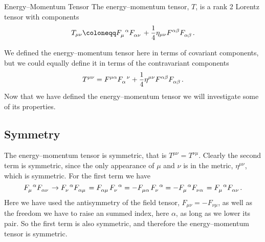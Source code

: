 \begin{dfn}{Energy--Momentum Tensor}{}
    The energy--momentum tensor, \(T\), is a rank 2 Lorentz tensor with components
    \begin{equation}
        T_{\mu\nu} \coloneqq \tensor{F}{_\mu^\alpha}\tensor{F}{_{\alpha\nu}} + \frac{1}{4}\eta_{\mu\nu}\tensor{F}{^{\alpha\beta}}\tensor{F}{_{\alpha\beta}}.
    \end{equation}
\end{dfn}
We defined the energy--momentum tensor here in terms of covariant components, but we could equally define it in terms of the contravariant components
\begin{equation}
    T^{\mu\nu} = \tensor{F}{^{\mu\alpha}}\tensor{F}{_\alpha^\nu} + \frac{1}{4}\eta^{\mu\nu}\tensor{F}{^{\alpha\beta}}\tensor{F}{_{\alpha\beta}}.
\end{equation}
Now that we have defined the energy--momentum tensor we will investigate some of its properties.

\subsection{Symmetry}
The energy--momentum tensor is symmetric, that is \(T^{\mu\nu} = T^{\nu\mu}\).
Clearly the second term is symmetric, since the only appearance of \(\mu\) and \(\nu\) is in the metric, \(\eta^{\mu\nu}\), which is symmetric.
For the first term we have
\begin{equation}
    \tensor{F}{_\mu^\alpha} \tensor{F}{_{\alpha\nu}} \to \tensor{F}{_\nu^\alpha}\tensor{F}{_{\alpha\mu}} = \tensor{F}{_{\alpha\mu}}\tensor{F}{_\nu^\alpha} = -\tensor{F}{_{\mu\alpha}}\tensor{F}{_\nu^\alpha} = -\tensor{F}{_\mu^\alpha}\tensor{F}{_{\nu\alpha}} = \tensor{F}{_\mu^\alpha}\tensor{F}{_{\alpha\nu}}.
\end{equation}
Here we have used the antisymmetry of the field tensor, \(F_{\mu\nu} = -F_{\nu\mu}\), as well as the freedom we have to raise an summed index, here \(\alpha\), as long as we lower its pair.
So the first term is also symmetric, and therefore the energy--momentum tensor is symmetric.

